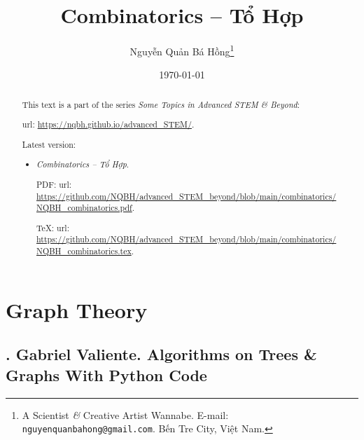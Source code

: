 \documentclass{article}
\title{Combinatorics -- Tổ Hợp}
\author{Nguyễn Quản Bá Hồng\footnote{A Scientist {\it\&} Creative Artist Wannabe. E-mail: {\tt nguyenquanbahong@gmail.com}. Bến Tre City, Việt Nam.}}
\date{\today}
\begin{document}
\maketitle
\begin{abstract}
	This text is a part of the series {\it Some Topics in Advanced STEM \& Beyond}:
	
	{\sc url}: \url{https://nqbh.github.io/advanced_STEM/}.
	
	Latest version:
	\begin{itemize}
		\item {\it Combinatorics -- Tổ Hợp}.
		
		PDF: {\sc url}: \url{https://github.com/NQBH/advanced_STEM_beyond/blob/main/combinatorics/NQBH_combinatorics.pdf}.
		
		\TeX: {\sc url}: \url{https://github.com/NQBH/advanced_STEM_beyond/blob/main/combinatorics/NQBH_combinatorics.tex}.
	\end{itemize}
\end{abstract}
\tableofcontents


\section{Graph Theory}

\subsection{\cite{Valiente2002, Valiente2021}. {\sc Gabriel Valiente}. Algorithms on Trees \& Graphs With Python Code}
\end{document}
